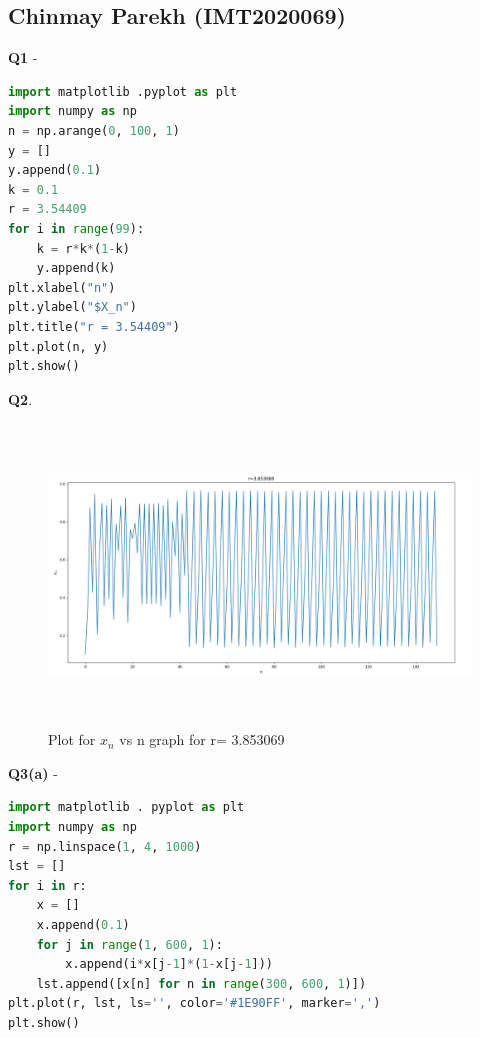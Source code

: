 \documentclass[11pt]{scrartcl} %
\begin{document}
\subsection{Chinmay Parekh (IMT2020069)}
\textbf{Q1} -
\begin{lstlisting}[language=Python, caption= Code for plotting $X_n$ vs n graph for a given r]
import matplotlib .pyplot as plt
import numpy as np
n = np.arange(0, 100, 1)
y = []
y.append(0.1)
k = 0.1
r = 3.54409
for i in range(99):
    k = r*k*(1-k)
    y.append(k)
plt.xlabel("n")
plt.ylabel("$X_n")
plt.title("r = 3.54409")
plt.plot(n, y)
plt.show()
\end{lstlisting}
\textbf{Q2}.
\begin{figure}[h] %
	\centering
	\includegraphics[width=12cm, height=8cm]{chinmay69.png} %
	\caption {Plot for $x_n$ vs n graph for r= 3.853069}
\end{figure}
\newpage
\textbf{Q3(a)} -
\begin{lstlisting}[language=Python, caption= Bifurcation diagram]
import matplotlib . pyplot as plt
import numpy as np
r = np.linspace(1, 4, 1000)
lst = []
for i in r:
    x = []
    x.append(0.1)
    for j in range(1, 600, 1):
        x.append(i*x[j-1]*(1-x[j-1]))
    lst.append([x[n] for n in range(300, 600, 1)])
plt.plot(r, lst, ls='', color='#1E90FF', marker=',')
plt.show()
\end{lstlisting}
\newpage
\end{document}
